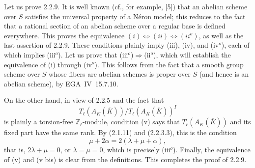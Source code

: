 Let us prove 2.2.9.  It is well known (cf., for example, [5]) that an
abelian scheme over $S$ satisfies the universal property of a
N\'{e}ron model; this reduces to the fact that a rational section of an
abelian scheme over a regular base is defined everywhere.  This proves
the equivalence
$(i)\Longleftrightarrow(ii)\Longleftrightarrow(ii^o)$, as well as the
last assertion of 2.2.9.  These conditions plainly imply (iii), (iv),
and (iv$^o$), each of which implies (iii$^o$).  Let us prove that
(iii$^o$)$\Longrightarrow$(ii$^o$), which will establish the
equivalence of (i) through (iv$^o$).  This follows from the fact that a
smooth group scheme over $S$ whose fibers are abelian schemes is proper
over $S$ (and hence is an abelian scheme), by EGA~IV~15.7.10.

On the other hand, in view of 2.2.5 and the fact that
\[
 T_\ell(A_K(\overline K))/T_\ell(A_K(\overline K))^I
\]
is plainly a torsion-free $\mathbb Z_\ell$-module, condition (v) says
that $T_\ell(A_K(\overline K))$ and its fixed part have the same rank.
By (2.1.11) and (2.2.3.3), this is the condition
\[
 \mu+2\alpha=2(\lambda+\mu+\alpha),
\]
that is, $2\lambda+\mu=0$, or $\lambda=\mu=0$, which is precisely
(iii$^o$).  Finally, the equivalence of (v) and (v bis) is clear from
the definitions.  This completes the proof of 2.2.9.
